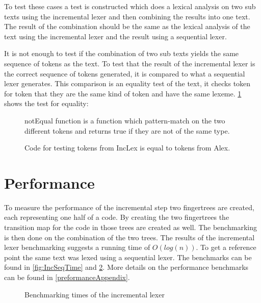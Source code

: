 To test these cases a test is constructed which does a lexical analysis on two
sub texts using the incremental lexer and then combining the results into one
text. The result of the combination should be the same as the lexical analysis
of the text using the incremental lexer and the result using a sequential lexer.

It is not enough to test if the combination of two sub texts yields the
same sequence of tokens as the text. To test that the result of the
incremental lexer is the correct sequence of tokens generated, it is compared to
what a sequential lexer generates. This comparison is an equality test of
the text, it checks token for token that they are the same kind of token and
have the same lexeme.
\cref{fig:CheckEquility} shows the test for equality:
\begin{figure}[h!]
  \centering
  
  notEqual function is a function which pattern-match on the two different
  tokens and returns true if they are not of the same type.
  \caption{Code for testing tokens from IncLex is equal to tokens from Alex. 
  \label{fig:CheckEquility}}
\end{figure}

\section{Performance}
To measure the performance of the incremental step two fingertrees are created,
each representing one half of a code. By creating the two fingertrees the
transition map for the code in those trees are created as well. The benchmarking
is then done on the combination of the two trees. The results of the incremental
lexer benchmarking suggests a running time of $O(log(n))$. To get a reference
point the same text was lexed using a sequential lexer. The benchmarks can be
found in \cref{fig:IncSeqTime} and \cref{fig:IncTime}. More details on the
performance benchmarks can be found in \cref{preformanceAppendix}.

\begin{figure}[!h]
\caption{Benchmarking times of the incremental lexer\label{fig:IncTime}}
\end{figure}

